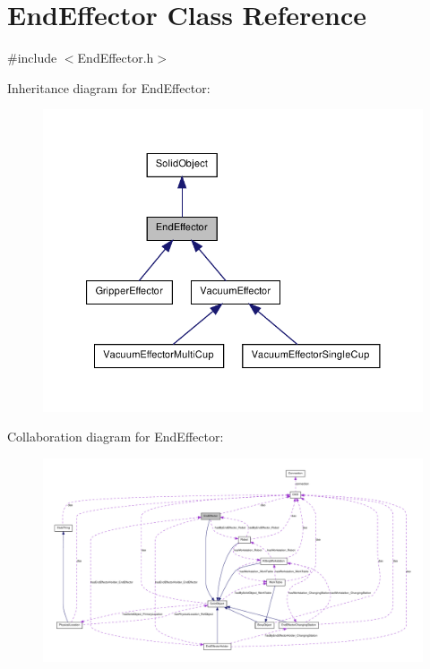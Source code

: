 \hypertarget{class_end_effector}{
\section{EndEffector Class Reference}
\label{class_end_effector}
}


{\ttfamily \#include $<$EndEffector.h$>$}



Inheritance diagram for EndEffector:\nopagebreak
\begin{figure}[H]
\begin{center}
\leavevmode
\includegraphics[width=347pt]{class_end_effector__inherit__graph}
\end{center}
\end{figure}


Collaboration diagram for EndEffector:\nopagebreak
\begin{figure}[H]
\begin{center}
\leavevmode
\includegraphics[width=400pt]{class_end_effector__coll__graph}
\end{center}
\end{figure}
